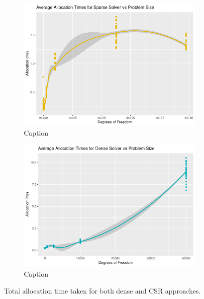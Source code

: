 \begin{figure}
	\centering
	\begin{subfigure}{0.48\linewidth}
		\centering
		\includegraphics[width = \linewidth]{Plots/alloc_sparse_vs_n}
		\caption{Caption}
		\label{fig:alloc_sparse}
	\end{subfigure}\hfill
	\begin{subfigure}{0.48\linewidth}
		\centering
		\includegraphics[width=\linewidth]{Plots/alloc_dense_vs_n}
		\caption{Caption}
		\label{fig:alloc_dense}
	\end{subfigure}
	\caption{Total allocation time taken for both dense and CSR approaches.}
	\label{fig:alloc}
\end{figure}
